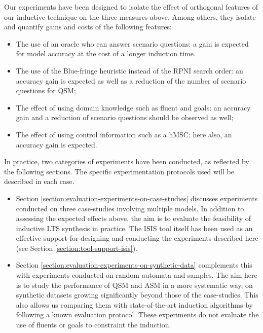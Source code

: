 Our experiments have been designed to isolate the effect of orthogonal features of our inductive technique on the three measures above. Among others, they isolate and quantify gains and costs of the following features:
\begin{itemize}
\item The use of an oracle who can answer scenario questions: a gain is expected for model accuracy at the cost of a longer induction time.
\item The use of the Blue-fringe heuristic instead of the RPNI search order: an accuracy gain is expected as well as a reduction of the number of scenario questions for QSM;
\item The effect of using domain knowledge such as fluent and goals: an accuracy gain and a reduction of scenario questions should be observed as well;
\item The effect of using control information such as a hMSC: here also, an accuracy gain is expected.
\end{itemize}

In practice, two categories of experiments have been conducted, as reflected by the following sections. The specific experimentation protocols used will be described in each case.
\begin{itemize}
\item Section \ref{section:evaluation-experiments-on-case-studies} discusses experiments conducted on three case-studies involving multiple models. In addition to assessing the expected effects above, the aim is to evaluate the feasibility of inductive LTS synthesis in practice. The ISIS tool itself has been used as an effective support for designing and conducting the experiments described here (see Section \ref{section:tool-support-isis}).
\item Section \ref{section:evaluation-experiments-on-synthetic-data} complements this with experiments conducted on random automata and samples. The aim here is to study the performance of QSM and ASM in a more systematic way, on synthetic datasets growing significantly beyond those of the case-studies. This also allows us comparing them with state-of-the-art induction algorithms by following a known evaluation protocol. These experiments do not evaluate the use of fluents or goals to constraint the induction. 
\end{itemize}

 
